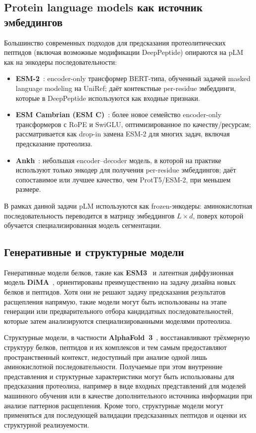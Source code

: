 \documentclass{article}
\begin{document}
\subsection{Protein language models как источник эмбеддингов}

Большинство современных подходов для предсказания  протеолитических пептидов  (включая возможные модификации DeepPeptide) опираются на pLM как на энкодеры последовательности:

\begin{itemize}
    \item \textbf{ESM-2}~\cite{ESM-family}: encoder-only трансформер BERT-типа, обученный задачей masked language modeling на UniRef; даёт контекстные per-residue эмбеддинги, которые в DeepPeptide используются как входные признаки.
    \item \textbf{ESM Cambrian (ESM C)}~\cite{esm_cambrian_blog_2024}: более новое семейство encoder-only трансформеров с RoPE и SwiGLU, оптимизированное по качеству/ресурсам; рассматривается как drop-in замена ESM-2 для многих задач, включая предсказание протеолиза.
    \item \textbf{Ankh}~\cite{ankh2023}: небольшая encoder--decoder модель, в которой на практике используют только энкодер для получения per-residue эмбеддингов; даёт сопоставимое или лучшее качество, чем ProtT5/ESM-2, при меньшем размере.
\end{itemize}

В рамках данной задачи pLM используются как frozen-энкодеры: аминокислотная последовательность переводится в матрицу эмбеддингов $L \times d$, поверх которой обучается специализированная модель сегментации.

\subsection{Генеративные и структурные модели}

Генеративные модели белков, такие как \textbf{ESM3}~\cite{ESM-family} и латентная диффузионная модель \textbf{DiMA}~\cite{dima2024}, ориентированы преимущественно на задачу дизайна новых белков и пептидов. Хотя они не решают задачу предсказания результатов расщепления напрямую, такие модели могут быть использованы на этапе генерации или предварительного отбора кандидатных последовательностей, которые затем анализируются специализированными моделями протеолиза.

Структурные модели, в частности \textbf{AlphaFold~3}~\cite{alphafold3_2024}, восстанавливают трёхмерную структуру белков, пептидов и их комплексов и тем самым предоставляют пространственный контекст, недоступный при анализе одной лишь аминокислотной последовательности. Получаемые при этом внутренние представления и структурные характеристики могут быть использованы для предсказания протеолиза, например в виде входных представлений для моделей машинного обучения или в качестве дополнительного источника информации при анализе паттернов расщепления. Кроме того, структурные модели могут применяться для последующей валидации предсказанных пептидов и оценки их структурной реализуемости.
\end{document}
